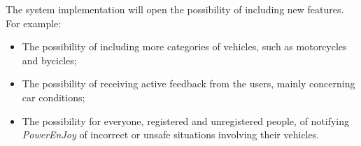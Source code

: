 The system implementation will open the possibility of including new features. For example:

\begin{itemize}
\item The possibility of including more categories of vehicles, such as motorcycles and bycicles;
\item The possibility of receiving active feedback from the users, mainly concerning car conditions;
\item The possibility for everyone, registered and unregistered people, of notifying \emph{PowerEnJoy} of incorrect or unsafe situations involving their vehicles.
\end{itemize}